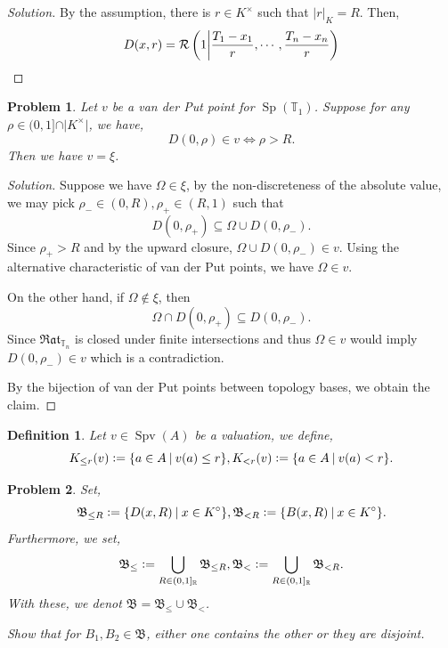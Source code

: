 \documentclass[8pt]{article}
\numberwithin{equation}{section}
\newenvironment{solution}{\begin{proof}[Solution]}{\end{proof}}
\newtheorem{definition}{Definition}[section]
\newtheorem{problem}{Problem}[section]
\DeclareMathOperator{\Sp}{Sp}
\DeclareMathOperator{\Spv}{Spv}
\newcommand{\defeq}{\vcentcolon=}
\newcommand{\R}[0]{\mathbb{R}}
\newcommand{\T}[0]{\mathbb{T}}
\newcommand{\cR}[0]{\mathcal{R}}
\newcommand{\sep}[0]{\:|\:}
\newcommand{\ab}[1]{\vert #1 \vert}
\newcommand{\Rat}[0]{\mathfrak{Rat}}
\begin{document}
\begin{solution}
  By the assumption, there is $r\in K^\times$ such that $\ab{r}_K=R$. Then,
  \begin{equation*}
    D(x,r) = \cR\left(1\bigg{\vert} {\frac {T_1-x_1} {r}},\cdots,{\frac {T_n-x_n} {r}}\right)
  \end{equation*}
\end{solution}
\begin{problem}
  Let $v$ be a van der Put point for $\Sp(\T_1)$. Suppose for any $\rho\in(0,1]\cap\ab{K^\times}$, we have,
  \begin{equation*}
    D(0,\rho)\in v\iff \rho > R.
  \end{equation*}
  Then we have $v=\xi$. 
\end{problem}
\begin{solution}
  Suppose we have $\Omega\in\xi$, by the non-discreteness of the absolute value, we may pick $\rho_-\in (0,R),\rho_+\in (R,1)$ such that
  \begin{equation*}
    D(0,\rho_+)\subseteq\Omega\cup D(0,\rho_-).
  \end{equation*}
  Since $\rho_+>R$ and by the upward closure, $\Omega\cup D(0,\rho_-)\in v$. Using the alternative characteristic of van der Put points, we have $\Omega\in v$.
  \par On the other hand, if $\Omega\not\in \xi$, then 
  \begin{equation*}
    \Omega\cap D(0,\rho_+)\subseteq D(0,\rho_-).
  \end{equation*}
  Since $\Rat_{\T_n}$ is closed under finite intersections and thus $\Omega\in v$ would imply $D(0,\rho_-)\in v$ which is a contradiction.
  \par By the bijection of van der Put points between topology bases, we obtain the claim.
\end{solution}
\begin{definition}
  Let $v\in\Spv(A)$ be a valuation, we define,
  \begin{equation*}
    K_{\leq r}(v) \defeq \{a\in A\sep v(a)\leq r\}, K_{< r}(v) \defeq \{a\in A\sep v(a)< r\}.
  \end{equation*}
\end{definition}
\begin{problem}
  Set,
  \begin{equation*}
    \mathfrak{B}_{\leq R}\defeq\{D(x,R)\sep x\in K^\circ\},\mathfrak{B}_{< R}\defeq\{B(x,R)\sep x\in K^\circ\}.
  \end{equation*}
  Furthermore, we set,
  \begin{equation*}
    \mathfrak{B}_{\leq}\defeq \bigcup_{R\in (0,1]_\R}\mathfrak{B}_{\leq R},\mathfrak{B}_{<}\defeq \bigcup_{R\in (0,1]_\R}\mathfrak{B}_{< R}.
  \end{equation*}
  With these, we denot $\mathfrak{B} = \mathfrak{B}_\leq\cup\mathfrak{B}_<$.
  \par Show that for $B_1,B_2\in\mathfrak{B}$, either one contains the other or they are disjoint.
\end{problem}
\end{document}
